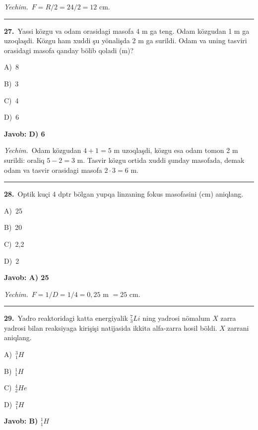 \documentclass[11pt,a4paper]{article}
\newcommand{\opt}[2]{\hspace*{4mm}#1)\ #2\par}
\begin{document}
\noindent\textit{Yechim.}\ $F=R/2=24/2=12$ cm.\par\par\medskip\hrule\medskip
{}\noindent\begin{minipage}{\linewidth}
\textbf{27.}\ Yassi közgu va odam orasidagi masofa 4 m ga teng. Odam közgudan 1 m ga uzoqlaşdi. Közgu ham xuddi şu yönalişda 2 m ga surildi. Odam va uning tasviri orasidagi masofa qanday bölib qoladi (m)?\par\smallskip
\opt{A}{8}
\opt{B}{3}
\opt{C}{4}
\opt{D}{6}
\end{minipage}\vspace{2pt}\par
\noindent\colorbox{gray!12}{\parbox{\dimexpr\linewidth-2\fboxsep}{\textbf{Javob: D) 6}}}\par\smallskip
\noindent\textit{Yechim.}\ Odam közgudan $4+1=5$ m uzoqlaşdi, közgu esa odam tomon 2 m surildi: oraliq $5-2=3$ m. Tasvir közgu ortida xuddi şunday masofada, demak odam va tasvir orasidagi masofa $2\cdot3=6$ m.\par\par\medskip\hrule\medskip
{}\noindent\begin{minipage}{\linewidth}
\textbf{28.}\ Optik kuçi 4 dptr bölgan yupqa linzaning fokus masofasini (cm) aniqlang.\par\smallskip
\opt{A}{25}
\opt{B}{20}
\opt{C}{2,2}
\opt{D}{2}
\end{minipage}\vspace{2pt}\par
\noindent\colorbox{gray!12}{\parbox{\dimexpr\linewidth-2\fboxsep}{\textbf{Javob: A) 25}}}\par\smallskip
\noindent\textit{Yechim.}\ $F=1/D=1/4=0{,}25$ m $=25$ cm.\par\par\medskip\hrule\medskip
{}\noindent\begin{minipage}{\linewidth}
\textbf{29.}\ Yadro reaktoridagi katta energiyalik $^7_3Li$ ning yadrosi nömalum $X$ zarra yadrosi bilan reaksiyaga kirişişi natijasida ikkita alfa-zarra hosil böldi. $X$ zarrani aniqlang.\par\smallskip
\opt{A}{$^3_1H$}
\opt{B}{$^1_1H$}
\opt{C}{$^4_2He$}
\opt{D}{$^2_1H$}
\end{minipage}\vspace{2pt}\par
\noindent\colorbox{gray!12}{\parbox{\dimexpr\linewidth-2\fboxsep}{\textbf{Javob: B) $^1_1H$}}}\par\smallskip
\end{document}
